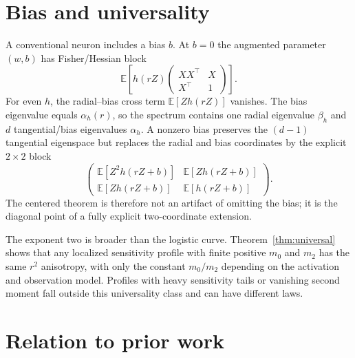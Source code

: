 \documentclass[11pt]{article}
\newcommand{\E}{\mathbb E}
\begin{document}
\section{Bias and universality}

A conventional neuron includes a bias $b$.  At $b=0$ the augmented parameter $(w,b)$ has Fisher/Hessian block
\[
 \E\!\left[h(rZ)
 \begin{pmatrix}XX^\top&X\\X^\top&1\end{pmatrix}\right].
\]
For even $h$, the radial--bias cross term $\E[Zh(rZ)]$ vanishes.  The bias eigenvalue equals $\alpha_h(r)$, so
the spectrum contains one radial eigenvalue $\beta_h$ and $d$ tangential/bias eigenvalues $\alpha_h$.  A nonzero
bias preserves the $(d-1)$ tangential eigenspace but replaces the radial and bias coordinates by the explicit
$2\times2$ block
\begin{equation}
 \begin{pmatrix}
  \E[Z^2h(rZ+b)] & \E[Zh(rZ+b)]\\
  \E[Zh(rZ+b)] & \E[h(rZ+b)]
 \end{pmatrix}.
 \label{eq:biasblock}
\end{equation}
The centered theorem is therefore not an artifact of omitting the bias; it is the diagonal point of a fully explicit
two-coordinate extension.

The exponent two is broader than the logistic curve.  Theorem~\ref{thm:universal} shows that any localized
sensitivity profile with finite positive $m_0$ and $m_2$ has the same $r^2$ anisotropy, with only the constant
$m_0/m_2$ depending on the activation and observation model.  Profiles with heavy sensitivity tails or vanishing
second moment fall outside this universality class and can have different laws.

\section{Relation to prior work}
\end{document}
